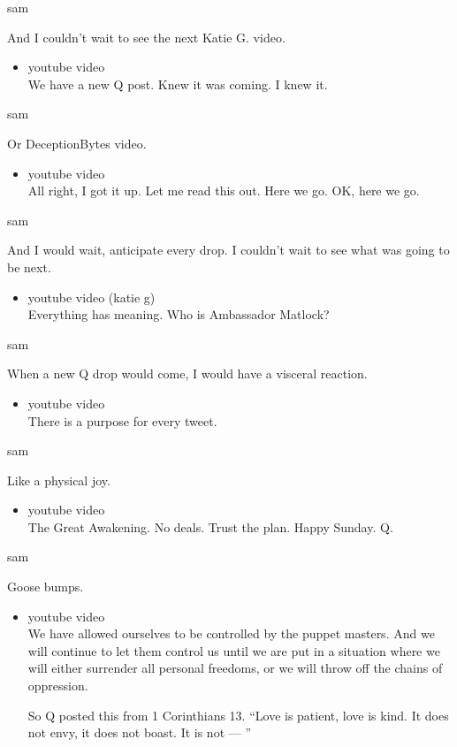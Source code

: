 sam

And I couldn't wait to see the next Katie G. video.

\begin{itemize}
\tightlist
\item
  youtube video\\
  We have a new Q post. Knew it was coming. I knew it.
\end{itemize}

sam

Or DeceptionBytes video.

\begin{itemize}
\tightlist
\item
  youtube video\\
  All right, I got it up. Let me read this out. Here we go. OK, here we
  go.
\end{itemize}

sam

And I would wait, anticipate every drop. I couldn't wait to see what was
going to be next.

\begin{itemize}
\tightlist
\item
  youtube video (katie g)\\
  Everything has meaning. Who is Ambassador Matlock?
\end{itemize}

sam

When a new Q drop would come, I would have a visceral reaction.

\begin{itemize}
\tightlist
\item
  youtube video\\
  There is a purpose for every tweet.
\end{itemize}

sam

Like a physical joy.

\begin{itemize}
\tightlist
\item
  youtube video\\
  The Great Awakening. No deals. Trust the plan. Happy Sunday. Q.
\end{itemize}

sam

Goose bumps.

\begin{itemize}
\item
  youtube video\\
  We have allowed ourselves to be controlled by the puppet masters. And
  we will continue to let them control us until we are put in a
  situation where we will either surrender all personal freedoms, or we
  will throw off the chains of oppression.

  So Q posted this from 1 Corinthians 13. ``Love is patient, love is
  kind. It does not envy, it does not boast. It is not --- ''
\end{itemize}

